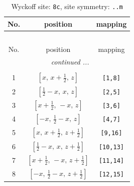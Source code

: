 \documentclass[fleqn,8pt]{jsarticle}
\begin{document}
\renewcommand{\arraystretch}{1.2}
\begin{longtable}{ccc}
\caption{Wyckoff site: {\tt 8c}, site symmetry: {\tt ..m}}
 \\
 \hline \hline
No. & position & mapping \\ \hline \endfirsthead

\multicolumn{2}{l}{\tablename\ \thetable{}} \\
 \hline \hline
No. & position & mapping \\ \hline \endhead

 \hline \hline
\multicolumn{2}{r}{\footnotesize\it continued ...} \\ \endfoot

 \hline \hline
\multicolumn{2}{r}{} \\ \endlastfoot

1 & $\left[ x,\, x + \frac{1}{2},\, z \right]$ & {\tt [1,8]} \\ \hline
2 & $\left[ \frac{1}{2} - x,\, x,\, z \right]$ & {\tt [2,5]} \\ \hline
3 & $\left[ x + \frac{1}{2},\, - x,\, z \right]$ & {\tt [3,6]} \\ \hline
4 & $\left[ - x,\, \frac{1}{2} - x,\, z \right]$ & {\tt [4,7]} \\ \hline
5 & $\left[ x,\, x + \frac{1}{2},\, z + \frac{1}{2} \right]$ & {\tt [9,16]} \\ \hline
6 & $\left[ \frac{1}{2} - x,\, x,\, z + \frac{1}{2} \right]$ & {\tt [10,13]} \\ \hline
7 & $\left[ x + \frac{1}{2},\, - x,\, z + \frac{1}{2} \right]$ & {\tt [11,14]} \\ \hline
8 & $\left[ - x,\, \frac{1}{2} - x,\, z + \frac{1}{2} \right]$ & {\tt [12,15]} \\
\end{longtable}
\renewcommand{\arraystretch}{1.2}
\end{document}
